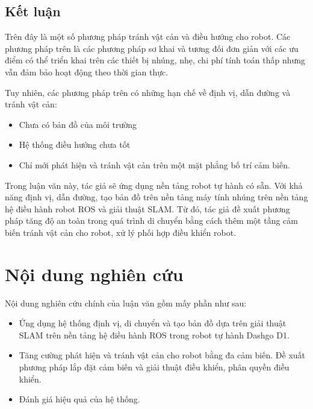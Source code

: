 \subsection*{Kết luận}
Trên đây là một số phương pháp tránh vật cản và điều hướng cho robot. Các phương pháp trên là các phương pháp sơ khai và tương đối đơn giản với các ưu điểm có thể triển khai trên các thiết bị nhúng, nhẹ, chi phí tính toán thấp nhưng vẫn đảm bảo hoạt động theo thời gian thực.

Tuy nhiên, các phương pháp trên có những hạn chế về định vị, dẫn đường và tránh vật cản:
\begin{itemize}
  \item Chưa có bản đồ của môi trường
  \item Hệ thống điều hướng chưa tốt
  \item Chỉ mới phát hiện và tránh vật cản trên một mặt phẳng bố trí cảm biến.
\end{itemize}

Trong luận văn này, tác giả sẽ ứng dụng nền tảng robot tự hành có sẵn. Với khả năng định vị, dẫn đường, tạo bản đồ trên nền tảng máy tính nhúng trên nền tảng hệ điều hành robot ROS và giải thuật SLAM. Từ đó, tác giả đề xuất phương pháp tăng độ an toàn trong quá trình di chuyển bằng cách thêm một tầng cảm biến tránh vật cản cho robot, xử lý phối hợp điều khiển robot.

\section{Nội dung nghiên cứu}
Nội dung nghiên cứu chính của luận văn gồm mấy phần như sau:

\begin{itemize}
  \item Ứng dụng hệ thống định vị, di chuyển và tạo bản đồ dựa trên giải thuật SLAM trên nền tảng hệ điều hành ROS trong robot tự hành Dashgo D1.
  \item Tăng cường phát hiện và tránh vật cản cho robot bằng đa cảm biến. Đề xuất phương pháp lắp đặt cảm biến và giải thuật điều khiển, phân quyền điều khiển.
  \item Đánh giá hiệu quả của hệ thống.
\end{itemize}

